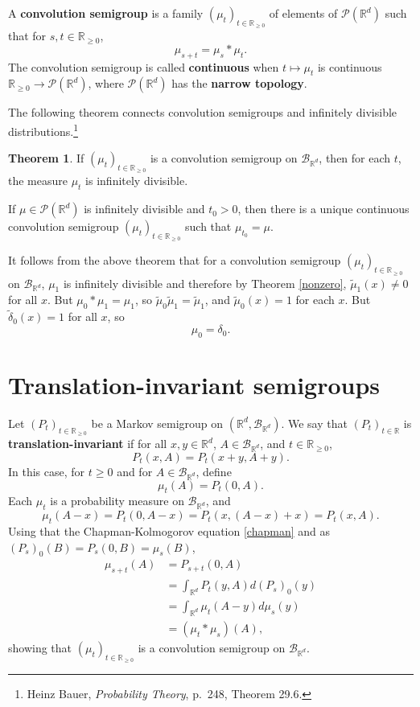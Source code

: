 \documentclass{article}
\theoremstyle{definition}
\newtheorem{theorem}{Theorem}
\theoremstyle{definition}
\begin{document}
A \textbf{convolution semigroup} is a family $(\mu_t)_{t \in \mathbb{R}_{\geq 0}}$ of elements
of $\mathscr{P}(\mathbb{R}^d)$ such that 
for $s,t \in \mathbb{R}_{\geq 0}$,
\[
\mu_{s+t} = \mu_s * \mu_t.
\]
The convolution semigroup is called \textbf{continuous} when $t \mapsto \mu_t$
is continuous $\mathbb{R}_{\geq 0} \to \mathscr{P}(\mathbb{R}^d)$, where $\mathscr{P}(\mathbb{R}^d)$
has the \textbf{narrow topology}.

The following theorem connects convolution semigroups and infinitely divisible distributions.\footnote{Heinz
Bauer, {\em Probability Theory}, p.~248, Theorem 29.6.}

\begin{theorem}
If $(\mu_t)_{t \in \mathbb{R}_{\geq 0}}$ is a convolution semigroup on
$\mathscr{B}_{\mathbb{R}^d}$, then for each
$t$, the measure $\mu_t$ is infinitely divisible. 

If $\mu \in \mathscr{P}(\mathbb{R}^d)$ is infinitely divisible and $t_0>0$, then there is a unique continuous convolution
semigroup $(\mu_t)_{t \in \mathbb{R}_{\geq 0}}$ such that $\mu_{t_0}=\mu$. 
\end{theorem}

It follows from the above theorem that for a convolution semigroup $(\mu_t)_{t \in \mathbb{R}_{\geq 0}}$
on $\mathscr{B}_{\mathbb{R}^d}$,
$\mu_1$ is infinitely divisible and therefore by Theorem \ref{nonzero}, $\tilde{\mu}_1(x) \neq 0$ for all $x$.
But $\mu_0 * \mu_1 = \mu_1$, so $\tilde{\mu}_0 \tilde{\mu}_1 = \tilde{\mu}_1$, and $\tilde{\mu}_0(x)=1$ for each
$x$. But $\tilde{\delta}_0(x)=1$ for all $x$, so
\begin{equation}
\mu_0=\delta_0.
\label{delta0}
\end{equation}


\section{Translation-invariant semigroups}
Let $(P_t)_{t \in \mathbb{R}_{\geq 0}}$ be a Markov semigroup on $(\mathbb{R}^d,\mathscr{B}_{\mathbb{R}^d})$.
We say that $(P_t)_{t \in \mathbb{R}}$ is \textbf{translation-invariant} if for all
$x,y \in \mathbb{R}^d$, $A \in \mathscr{B}_{\mathbb{R}^d}$, and $t \in \mathbb{R}_{\geq 0}$,
\[
P_t(x,A) = P_t(x+y,A+y).
\]
In this case, for $t \geq 0$ and for $A \in \mathscr{B}_{\mathbb{R}^d}$, define
\[
\mu_t(A) = P_t(0,A).
\]
Each $\mu_t$ is a probability measure on $\mathscr{B}_{\mathbb{R}^d}$, and
\[
\mu_t(A-x) = P_t(0,A-x) = P_t(x,(A-x)+x) = P_t(x,A).
\]
Using that the Chapman-Kolmogorov equation \eqref{chapman} and as
$(P_s)_0(B)=P_s(0,B)=\mu_s(B)$,
\begin{align*}
\mu_{s+t}(A)&=P_{s+t}(0,A)\\
&=\int_{\mathbb{R}^d} P_t(y,A) d(P_s)_0(y)\\
&=\int_{\mathbb{R}^d} \mu_t(A-y) d\mu_s(y)\\
&=(\mu_t * \mu_s)(A),
\end{align*}
showing that $(\mu_t)_{t \in \mathbb{R}_{\geq 0}}$ is a convolution semigroup on $\mathscr{B}_{\mathbb{R}^d}$.
\end{document}
